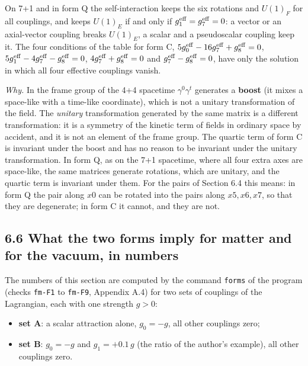 \documentclass[
  10pt,
]{article}
\providecommand{\tightlist}{%
  \setlength{\itemsep}{0pt}\setlength{\parskip}{0pt}}
\begin{document}
On 7+1 and in form Q the self-interaction keeps the six rotations and
\(U(1)_F\) for all couplings, and keeps \(U(1)_E\) if and only if
\(g_1^{\rm eff}=g_7^{\rm eff}=0\): a vector or an axial-vector coupling
breaks \(U(1)_E\), a scalar and a pseudoscalar coupling keep it. The
four conditions of the table for form C,
\(5g_0^{\rm eff}-16g_7^{\rm eff}+g_8^{\rm eff}=0\),
\(5g_1^{\rm eff}-4g_7^{\rm eff}-g_8^{\rm eff}=0\),
\(4g_7^{\rm eff}+g_8^{\rm eff}=0\) and
\(g_7^{\rm eff}-g_8^{\rm eff}=0\), have only the solution in which all
four effective couplings vanish.

\emph{Why.} In the frame group of the 4+4 spacetime \(\gamma^0\gamma^t\)
generates a \textbf{boost} (it mixes a space-like with a time-like
coordinate), which is not a unitary transformation of the field. The
\emph{unitary} transformation generated by the same matrix is a
different transformation: it is a symmetry of the kinetic term of fields
in ordinary space by accident, and it is not an element of the frame
group. The quartic term of form C is invariant under the boost and has
no reason to be invariant under the unitary transformation. In form Q,
as on the 7+1 spacetime, where all four extra axes are space-like, the
same matrices generate rotations, which are unitary, and the quartic
term is invariant under them. For the pairs of Section 6.4 this means:
in form Q the pair along \(x0\) can be rotated into the pairs along
\(x5,x6,x7\), so that they are degenerate; in form C it cannot, and they
are not.

\hypertarget{what-the-two-forms-imply-for-matter-and-for-the-vacuum-in-numbers}{%
\subsection{6.6 What the two forms imply for matter and for the vacuum,
in
numbers}\label{what-the-two-forms-imply-for-matter-and-for-the-vacuum-in-numbers}}

The numbers of this section are computed by the command \texttt{forms}
of the program (checks \texttt{fm-F1} to \texttt{fm-F9}, Appendix A.4)
for two sets of couplings of the Lagrangian, each with one strength
\(g>0\):

\begin{itemize}
\tightlist
\item
  \textbf{set A}: a scalar attraction alone, \(g_0=-g\), all other
  couplings zero;
\item
  \textbf{set B}: \(g_0=-g\) and \(g_1=+0.1\,g\) (the ratio of the
  author's example), all other couplings zero.
\end{itemize}
\end{document}
